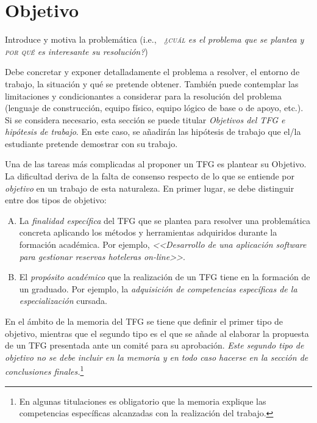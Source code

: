 \chapter{Objetivo}
\label{cap:Objetivo}

Introduce y motiva la problemática (i.e., \emph{\ ¿\textsc{cuál} es el problema que se plantea y \textsc{por qué} es interesante su resolución?})

Debe concretar y exponer detalladamente el problema a resolver, el entorno de 
trabajo, la situación y qué se pretende obtener. También puede contemplar las 
limitaciones y condicionantes a considerar para la resolución del problema 
(lenguaje de construcción, equipo físico, equipo lógico de base o de apoyo, 
etc.). Si se considera necesario, esta sección se puede titular 
\emph{Objetivos del TFG e hipótesis de trabajo}. En este caso, se añadirán 
las hipótesis de trabajo que el/la estudiante pretende demostrar con su trabajo.

Una de las tareas más complicadas al proponer un TFG es plantear su \textsf{Objetivo}. La dificultad deriva de la falta de consenso respecto de lo que se entiende por \emph{objetivo} en un trabajo de esta naturaleza. En primer lugar, se debe distinguir entre dos tipos de objetivo:


\begin{enumerate}[(A)]
	\item La \emph{finalidad específica} del TFG que se plantea para resolver una problemática concreta aplicando los métodos y herramientas adquiridos durante la formación académica. Por ejemplo, \emph{<<Desarrollo de una aplicación software para gestionar reservas hoteleras \emph{on-line}>>}.
	
	\item El \emph{propósito académico} que la realización de un TFG tiene en la formación de un graduado. Por ejemplo, la \emph{adquisición de competencias específicas de la especialización} cursada.
\end{enumerate}

En el ámbito de la memoria del TFG se tiene que definir el primer tipo de objetivo, mientras que el segundo tipo es el que se añade al elaborar la propuesta de un TFG presentada ante un comité para su aprobación. \emph{Este segundo tipo de objetivo no se debe incluir en la memoria y en todo caso hacerse en la sección de conclusiones finales.}\footnote{En algunas titulaciones es obligatorio que la memoria explique las competencias específicas alcanzadas con la realización del trabajo.}


